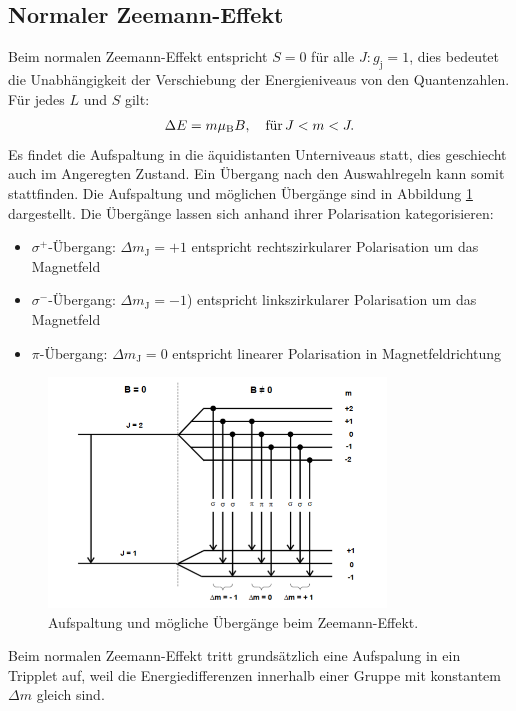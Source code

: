 \subsection{Normaler Zeemann-Effekt}
Beim normalen Zeemann-Effekt entspricht $S=0$ für alle $J:g_\mathrm{j}=1$,
dies bedeutet die Unabhängigkeit der Verschiebung der Energieniveaus von den Quantenzahlen.
Für jedes $L$ und $S$ gilt:
\begin{align}
  \Delta E=m\mu_\mathrm{B}B ,\,\,\,\,\ \text{für}\,\-J < m < J. \label{eqn:landean}
\end{align}
Es findet die Aufspaltung in die äquidistanten Unterniveaus statt, dies geschiecht auch im Angeregten Zustand.
Ein Übergang nach den Auswahlregeln kann somit stattfinden.
Die Aufspaltung und möglichen Übergänge sind in Abbildung \ref{fig:normal} dargestellt.
Die Übergänge lassen sich anhand ihrer Polarisation kategorisieren:
\begin{itemize}
  \item{$\sigma^+$-Übergang: $\Delta m_\mathrm{J}=+1$  entspricht rechtszirkularer Polarisation um das Magnetfeld}
  \item{$\sigma^-$-Übergang: $\Delta m_\mathrm{J}=-1$) entspricht linkszirkularer Polarisation um das Magnetfeld }
  \item{$\pi$-Übergang: $\Delta m_\mathrm{J}=0$ entspricht linearer Polarisation in Magnetfeldrichtung}
\end{itemize}
\begin{figure}
   \centering
    \includegraphics[width=0.8\textwidth]{normal.PNG}
    \caption{Aufspaltung und mögliche Übergänge beim Zeemann-Effekt.\cite{skript}}
    \label{fig:normal}
\end{figure}
Beim normalen Zeemann-Effekt tritt grundsätzlich eine Aufspalung in ein Tripplet auf, weil die Energiedifferenzen
innerhalb einer Gruppe mit konstantem $\Delta m$ gleich sind.
